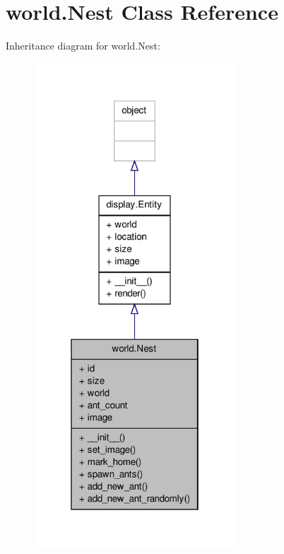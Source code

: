 \hypertarget{classworld_1_1Nest}{\section{world.\+Nest Class Reference}
\label{classworld_1_1Nest}
}


Inheritance diagram for world.\+Nest\+:
\nopagebreak
\begin{figure}[H]
\begin{center}
\leavevmode
\includegraphics[width=214pt]{classworld_1_1Nest__inherit__graph}
\end{center}
\end{figure}


